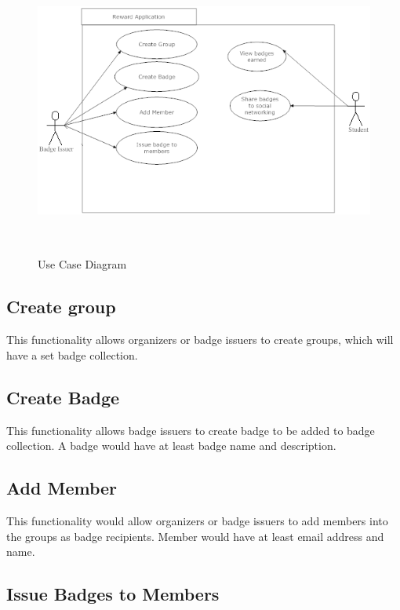 \vspace{3em}
\begin{figure}[H]
\begin{center}
\includegraphics[height=3.8in,width=6.5in]{images/UseCase.png}
\caption{Use Case Diagram}
\label{fig:use_case}
\end{center}
\end{figure}

\subsection{Create group}

This functionality allows organizers or badge issuers to create groups, which will have a set badge collection.

\subsection{Create Badge} 

This functionality allows badge issuers to create badge to be added to badge collection. A badge would have at least badge name and description.

\subsection{Add Member}

This functionality would allow organizers or badge issuers to add members into the groups as badge recipients. Member would have at least email address and name.

\subsection{Issue Badges to Members}

